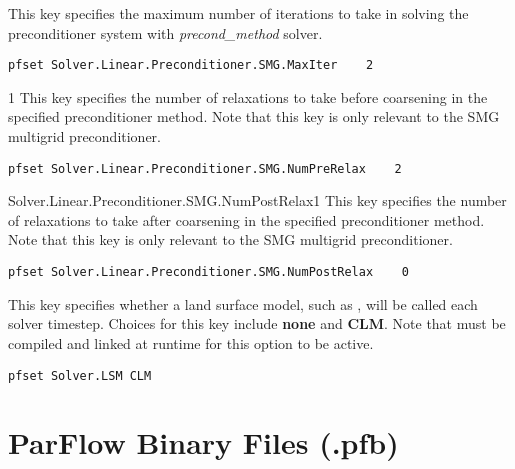 {This key specifies the maximum number of iterations to take in solving the 
preconditioner system with {\em precond\_method} solver.
}
\begin{display}\begin{verbatim}
pfset Solver.Linear.Preconditioner.SMG.MaxIter    2
\end{verbatim}\end{display}

{1}
{This key specifies the number of relaxations to take before coarsening in the
specified preconditioner method.  Note that this key is only relevant to
the SMG multigrid preconditioner.
}
\begin{display}\begin{verbatim}
pfset Solver.Linear.Preconditioner.SMG.NumPreRelax    2
\end{verbatim}\end{display}

{Solver.Linear.Preconditioner.SMG.NumPostRelax}{1}
{This key specifies the number of relaxations to take after coarsening in the
specified preconditioner method.  Note that this key is only relevant to
the SMG multigrid preconditioner.
}
\begin{display}\begin{verbatim}
pfset Solver.Linear.Preconditioner.SMG.NumPostRelax    0
\end{verbatim}\end{display}

{This key specifies whether a land surface model, such as , will be called each solver timestep.
Choices for this key include {\bf none} and {\bf CLM}. Note that  must be compiled and linked at runtime for this option to be active.
}
\begin{display}\begin{verbatim}
pfset Solver.LSM CLM
\end{verbatim}\end{display}


\section{ParFlow Binary Files (.pfb)}
\label{ParFlow Binary Files (.pfb)}


